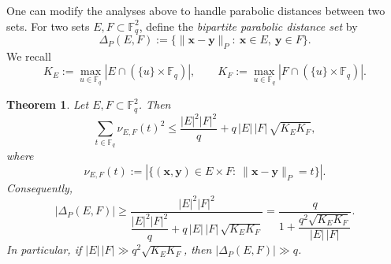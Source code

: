 \documentclass{article}
\newtheorem{theorem}{Theorem}
\newcommand{\F}{\mathbb{F}}
\newcommand{\abs}[1]{\left|#1\right|}
\newcommand{\1}{\mathbf{1}}
\begin{document}
One can modify the analyses above to handle parabolic distances between two sets. For two sets $E,F\subset \F_q^2$, define the \emph{bipartite parabolic distance set} by
\[
\Delta_P(E,F):=\{\|\mathbf{x}-\mathbf{y}\|_P:\ \mathbf{x}\in E,\ \mathbf{y}\in F\}.
\]
We recall
\[
K_E:=\max_{u\in \F_q}\abs{E\cap (\{u\}\times \F_q)},
\qquad
K_F:=\max_{u\in \F_q}\abs{F\cap (\{u\}\times \F_q)}.
\]

\begin{theorem}\label{thm:bipartite}
Let $E,F\subset \F_q^2$. Then
\[
\sum_{t\in\F_q}\nu_{E,F}(t)^2
\le
\frac{|E|^2|F|^2}{q}
+
q\,|E|\,|F|\,\sqrt{K_EK_F},
\]
where
\[
\nu_{E,F}(t):=
\abs{\{(\mathbf{x},\mathbf{y})\in E\times F:\ \|\mathbf{x}-\mathbf{y}\|_P=t\}}.
\]
Consequently,
\[
\abs{\Delta_P(E,F)}
\ge
\frac{|E|^2|F|^2}
{\dfrac{|E|^2|F|^2}{q}+q\,|E|\,|F|\,\sqrt{K_EK_F}}
=
\frac{q}{1+\dfrac{q^2\sqrt{K_EK_F}}{|E|\,|F|}}.
\]
In particular, if $|E|\,|F|\gg q^2\sqrt{K_EK_F}$, then $\abs{\Delta_P(E,F)}\gg q$.
\end{theorem}
\end{document}
